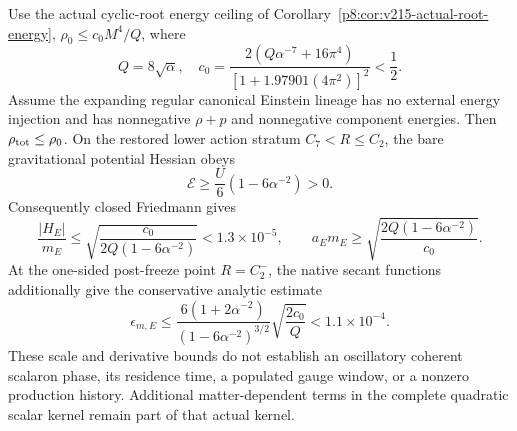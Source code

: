 \documentclass[12pt,a4paper]{article}
\begin{document}
\begin{proposition}
\label{p9:prop:v215-post-freeze-chart-bounds}
Use the actual cyclic-root energy ceiling of
Corollary~\ref{p8:cor:v215-actual-root-energy},
$\rho_0\le c_0M^4/Q$, where
\[
 Q=8\sqrt\alpha,\quad
 c_0=\frac{2(Q\alpha^{-7}+16\pi^4)}
              {[1+1.97901(4\pi^2)]^2}<\frac12.
\]
Assume the expanding regular canonical Einstein lineage has no external
energy injection and has nonnegative $\rho+p$ and nonnegative component
energies. Then $\rho_{\rm tot}\le\rho_0$. On the restored lower action
stratum $C_7<R\le C_2$, the bare gravitational potential Hessian obeys
\[
 \mathcal E\ge\frac U6(1-6\alpha^{-2})>0.
\]
Consequently closed Friedmann gives
\[
 \frac{|H_E|}{m_E}\le
  \sqrt{\frac{c_0}{2Q(1-6\alpha^{-2})}}<1.3\times10^{-5},
 \qquad
 a_Em_E\ge\sqrt{\frac{2Q(1-6\alpha^{-2})}{c_0}}.
\tag{MC.3}\label{p9:eq:v215-canonical-energy-scale-bounds}
\]
At the one-sided post-freeze point $R=C_2^-$, the native secant
functions additionally give the conservative analytic estimate
\[
 \boxed{\epsilon_{m,E}\le
 \frac{6(1+2\alpha^{-2})}{(1-6\alpha^{-2})^{3/2}}
          \sqrt{\frac{2c_0}{Q}}<1.1\times10^{-4}.}
\tag{MC.4}\label{p9:eq:v215-post-freeze-mass-slow}
\]
These scale and derivative bounds do not establish an oscillatory
coherent scalaron phase, its residence time, a populated gauge window,
or a nonzero production history. Additional matter-dependent terms in
the complete quadratic scalar kernel remain part of that actual kernel.
\end{proposition}
\end{document}
